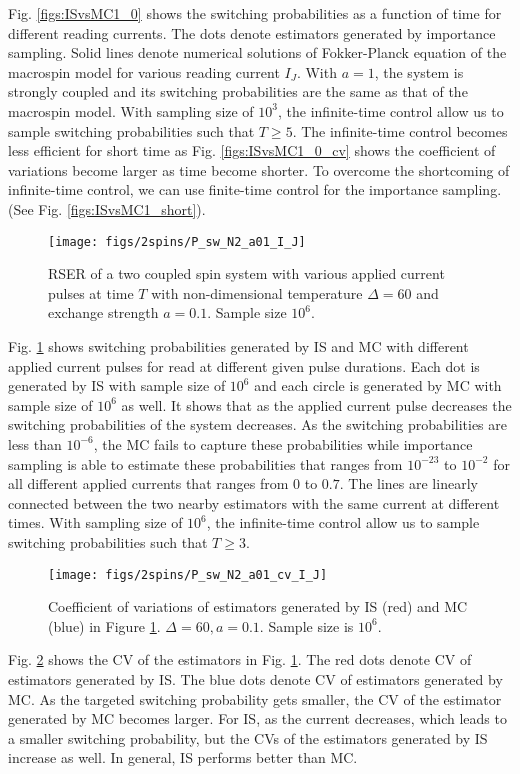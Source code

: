 \documentclass[journal,transmag]{IEEEtran}
\begin{document}
Fig. \ref{figs:ISvsMC1_0} shows the switching probabilities as a function of time for different reading currents.  The dots denote estimators generated by importance sampling. Solid lines denote numerical solutions of Fokker-Planck equation of the macrospin model for various reading current $I_J$. With $a = 1$, the system is strongly coupled and its switching probabilities are the same as that of the macrospin model. With sampling size of $10^3$, the infinite-time control allow us to sample switching probabilities such that $T \ge 5$. The infinite-time control becomes less efficient for short time as Fig. \ref{figs:ISvsMC1_0_cv} shows the coefficient of variations become larger as time become shorter. To overcome the shortcoming of infinite-time control, we can use finite-time control for the importance sampling. (See Fig. \ref{figs:ISvsMC1_short}).
  \begin{figure}[h]
   \centering
         \texttt{[image: figs/2spins/P\_sw\_N2\_a01\_I\_J]}    
   \caption{RSER of a two coupled spin system with various applied current pulses at time $T$ with non-dimensional temperature $\Delta = 60$ and exchange strength $ a = 0.1$. Sample size $10^6$.}
   \label{figs:ISvsMC2}
\end{figure}
Fig. \ref{figs:ISvsMC2} shows switching probabilities generated by IS and MC with different applied current pulses for read at different given pulse durations.  Each dot is generated by IS with sample size of $10^6$ and each circle is generated by MC with sample size of $10^6$ as well. It shows that as the applied current pulse decreases the switching probabilities of the system decreases. As the switching probabilities are less than $10^{-6}$, the MC fails to capture these probabilities while importance sampling is able to estimate these probabilities that ranges from $10^{-23}$ to $10^{-2}$ for all different applied currents that  ranges from $0$ to $0.7$.  The lines are linearly connected between the two nearby estimators with the same current at different times. With sampling size of $10^6$, the infinite-time control allow us to sample switching probabilities such that $T \ge 3$. 
  \begin{figure}[h]
   \centering
         \texttt{[image: figs/2spins/P\_sw\_N2\_a01\_cv\_I\_J]}    
   \caption{Coefficient of variations of estimators generated by IS (red) and MC (blue) in Figure \ref{figs:ISvsMC2}. $\Delta = 60, a = 0.1$. Sample size is $10^6$. }
   \label{figs:ISvsMC2_cv}
\end{figure}
%
Fig. \ref{figs:ISvsMC2_cv} shows the CV of the estimators in Fig. \ref{figs:ISvsMC2}. The red dots denote CV of estimators generated by IS. The blue dots denote CV of estimators generated by MC. As the targeted switching probability gets smaller, the CV of the  estimator generated by MC becomes larger.  For IS, as the current decreases, which leads to a smaller switching probability, but the CVs of the estimators generated by IS increase as well. In general, IS performs better than MC. 
\end{document}
